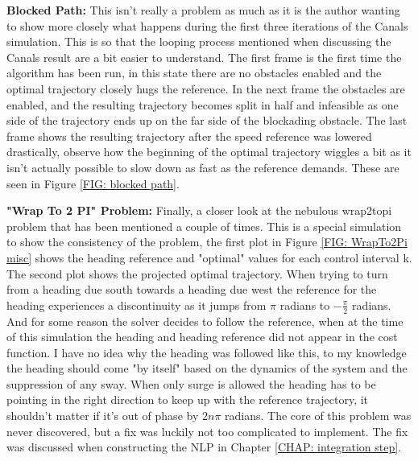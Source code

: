 \textbf{Blocked Path:}\newline
This isn't really a problem as much as it is the author wanting to show more closely what happens during the first three iterations
of the Canals simulation. This is so that the looping process mentioned when discussing the Canals result are a bit easier to understand.
The first frame is the first time the algorithm has been run, in this state there are no obstacles enabled and the optimal trajectory
closely hugs the reference. In the next frame the obstacles are enabled, and the resulting trajectory becomes split in half and infeasible
as one side of the trajectory ends up on the far side of the blockading obstacle. The last frame shows the resulting trajectory
after the speed reference was lowered drastically, observe how the beginning of the optimal trajectory wiggles a bit as it isn't 
actually possible to slow down as fast as the reference demands. These are seen in Figure \ref{FIG: blocked path}.

\textbf{"Wrap To 2 PI" Problem:}\label{CHAP: WrapTo2Pi problem}\newline
Finally, a closer look at the nebulous wrap2topi problem that has been mentioned a couple of times. This is a special simulation
to show the consistency of the problem, the first plot in Figure \ref{FIG: WrapTo2Pi misc} shows the heading reference and
"optimal" values for each control interval k. The second plot shows the projected optimal trajectory.
When trying to turn from a heading due south towards a heading due west the reference for the heading experiences a 
discontinuity as it jumps from $\pi$ radians to $-\frac{\pi}{2}$ radians. And for some reason the solver decides to follow the reference, when 
at the time of this simulation the heading and heading reference did not appear in the cost function. I have no idea why
the heading was followed like this, to my knowledge the heading should come "by itself" based on the dynamics of the system and the
suppression of any sway. When only surge is allowed the heading has to be pointing in the right direction to keep up with
the reference trajectory, it shouldn't matter if it's out of phase by $2n\pi$ radians. The core of this problem was never discovered, but
a fix was luckily not too complicated to implement. The fix was discussed when constructing the \gls{NLP} in Chapter \ref{CHAP: integration step}.

